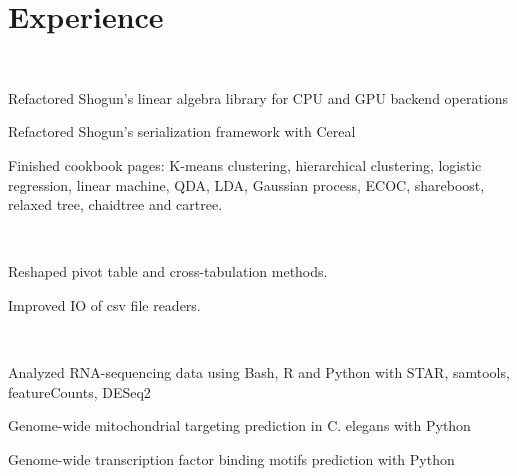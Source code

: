 \documentclass[]{deedy-resume-openfont}
\begin{document}
\hfill
\begin{minipage}[t]{0.66\textwidth} 


\section{Experience}

 \\
\vspace{\topsep} %
\begin{tightemize}\item Refactored Shogun’s linear algebra library for CPU and GPU backend operations \item	Refactored Shogun’s serialization framework with Cereal \item Finished cookbook pages: K-means clustering, hierarchical clustering, logistic regression, linear machine, QDA, LDA, Gaussian process, ECOC, shareboost, relaxed tree, chaidtree and cartree.
\end{tightemize}
\sectionsep

 \\
\begin{tightemize}\item Reshaped pivot table and cross-tabulation methods. \item	Improved IO of csv file readers.
\end{tightemize}
\sectionsep

 \\
\begin{tightemize}
\item Analyzed RNA-sequencing data using Bash, R and Python with STAR, samtools, featureCounts, DESeq2 \item Genome-wide mitochondrial targeting prediction in C. elegans with Python \item Genome-wide transcription factor binding motifs prediction with Python
\end{tightemize}
\sectionsep


\end{minipage}
\end{document}
